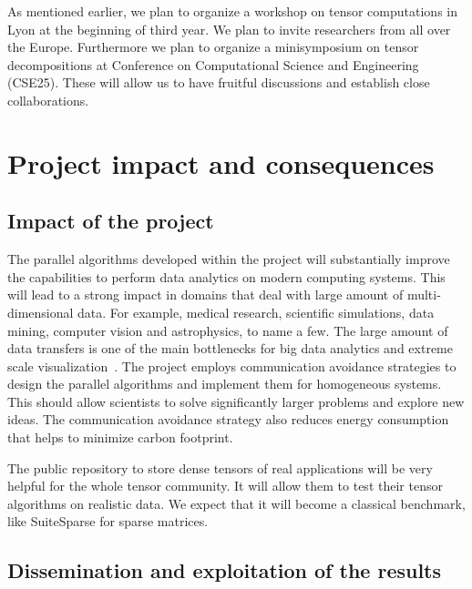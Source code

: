 \documentclass[a4paper,11pt]{article}
\begin{document}
	As mentioned earlier, we plan to organize a workshop on tensor computations in Lyon at the beginning of third year. We plan to invite researchers from all over the Europe. Furthermore we plan to organize a minisymposium on tensor decompositions at Conference on Computational Science and Engineering (CSE25). These will allow us to have fruitful discussions and establish close collaborations.
	
	
	

	\section{Project impact and consequences}
	\label{sec:impact}
	\subsection*{Impact of the project}
	The parallel algorithms developed within the project will substantially improve the capabilities to perform data analytics on modern computing systems. This will lead to a strong impact in domains that deal with large amount of multi-dimensional data. For example, medical research, scientific simulations, data mining, computer vision and astrophysics, to name a few. The large amount of data transfers is one of the main bottlenecks for big data analytics and extreme scale visualization~\cite{DOE-Report-2014}. The project employs communication avoidance strategies to design the parallel algorithms and implement them for homogeneous systems. This should allow scientists to solve significantly larger problems and explore new ideas. The communication avoidance strategy also reduces energy consumption that helps to minimize carbon footprint.
	
	The public repository to store dense tensors of real applications will be very helpful for the whole tensor community. It will allow them to test their tensor algorithms on realistic data. We expect that it will become a classical benchmark, like SuiteSparse for sparse matrices.
	
	
	
	\subsection*{Dissemination and exploitation of the results}
	
\end{document}
